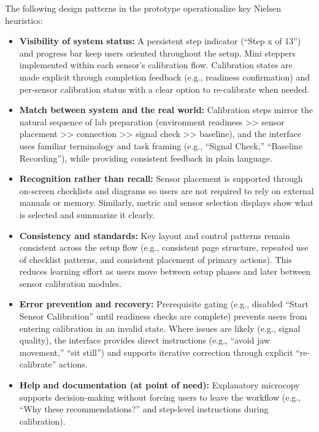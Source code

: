 \documentclass[
]{article}
\begin{document}
The following design patterns in the prototype operationalize key Nielsen heuristics:

\begin{itemize}
\item
  \textbf{Visibility of system status:} A persistent step indicator (``Step x of 13'') and progress bar keep users oriented throughout the setup. Mini steppers implemented within each sensor's calibration flow. Calibration states are made explicit through completion feedback (e.g., readiness confirmation) and per-sensor calibration status with a clear option to re-calibrate when needed.
\item
  \textbf{Match between system and the real world:} Calibration steps mirror the natural sequence of lab preparation (environment readiness \textgreater\textgreater{} sensor placement \textgreater\textgreater{} connection \textgreater\textgreater{} signal check \textgreater\textgreater{} baseline), and the interface uses familiar terminology and task framing (e.g., ``Signal Check,'' ``Baseline Recording''), while providing consistent feedback in plain language.
\item
  \textbf{Recognition rather than recall:} Sensor placement is supported through on-screen checklists and diagrams so users are not required to rely on external manuals or memory. Similarly, metric and sensor selection displays show what is selected and summarize it clearly.
\item
  \textbf{Consistency and standards:} Key layout and control patterns remain consistent across the setup flow (e.g., consistent page structure, repeated use of checklist patterns, and consistent placement of primary actions). This reduces learning effort as users move between setup phases and later between sensor calibration modules.
\item
  \textbf{Error prevention and recovery:} Prerequisite gating (e.g., disabled ``Start Sensor Calibration'' until readiness checks are complete) prevents users from entering calibration in an invalid state. Where issues are likely (e.g., signal quality), the interface provides direct instructions (e.g., ``avoid jaw movement,'' ``sit still'') and supports iterative correction through explicit ``re-calibrate'' actions.
\item
  \textbf{Help and documentation (at point of need):} Explanatory microcopy supports decision-making without forcing users to leave the workflow (e.g., ``Why these recommendations?'' and step-level instructions during calibration).
\end{itemize}
\end{document}
